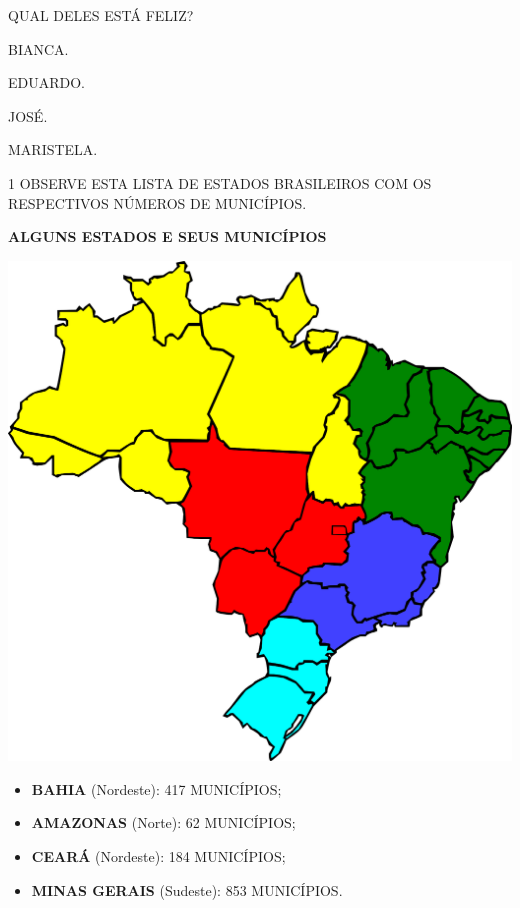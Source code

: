 QUAL DELES ESTÁ FELIZ?

\begin{multicols}{2}
\begin{escolha}%
\item BIANCA.

\item EDUARDO.

\item JOSÉ.

\item MARISTELA.
\end{escolha}
\end{multicols}

\pagebreak




\num{1} OBSERVE ESTA LISTA DE ESTADOS BRASILEIROS COM OS RESPECTIVOS NÚMEROS DE MUNICÍPIOS.

\begin{myquote}
\textbf{ALGUNS ESTADOS E SEUS MUNICÍPIOS}

\begin{center}
\includegraphics[width=.8\textwidth]{media/image120.png}
\end{center}

\begin{itemize}
  \item \textbf{BAHIA} (Nordeste): 417 MUNICÍPIOS;
  \item \textbf{AMAZONAS} (Norte): 62 MUNICÍPIOS;
  \item \textbf{CEARÁ} (Nordeste): 184 MUNICÍPIOS;
  \item \textbf{MINAS GERAIS} (Sudeste): 853 MUNICÍPIOS.
\end{itemize}
\end{myquote}

